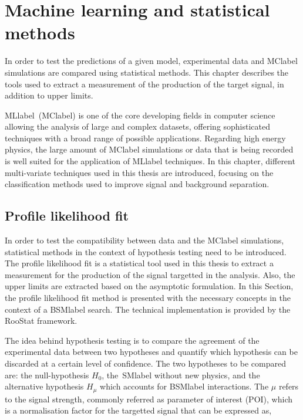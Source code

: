 \chapter{Machine learning and statistical methods}
\label{chapter:MLStat}

In order to test the predictions of a given model, experimental data and \acrshort{MClabel} simulations are compared using statistical methods. This chapter describes the tools used to extract a measurement of the production of the target signal, in addition to upper limits.

\acrlong{MLlabel}~(\acrshort{MClabel}) is one of the core developing fields in computer science allowing the analysis of large and complex datasets, offering sophisticated techniques with a broad range of possible applications. Regarding high energy physics, the large amount of \acrshort{MClabel} simulations or data that is being recorded is well suited for the application of \acrshort{MLlabel} techniques. In this chapter, different multi-variate techniques used in this thesis are introduced, focusing on the classification methods used to improve signal and background separation.

\section{Profile likelihood fit}

In order to test the compatibility between data and the \acrshort{MClabel} simulations, statistical methods in the context of hypothesis testing need to be introduced. The profile likelihood fit is a statistical tool used in this thesis to extract a measurement for the production of the signal targetted in the analysis. Also, the upper limits are extracted based on the asymptotic formulation. In this Section, the profile likelihood fit method is presented with the necessary concepts in the context of a \acrshort{BSMlabel} search. %
The technical implementation is provided by the RooStat framework. %

The idea behind hypothesis testing is to compare the agreement of the experimental data between two hypotheses and quantify which hypothesis can be discarded at a certain level of confidence. The two hypotheses to be compared are: the null-hypothesis $H_0$, the~\acrshort{SMlabel} without new physics, and the alternative hypothesis $H_\mu$ which accounts for \acrshort{BSMlabel} interactions. The $\mu$ refers to the signal strength, commonly referred as parameter of interest (POI), which is a normalisation factor for the targetted signal that can be expressed as,

